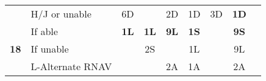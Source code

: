 \documentclass[10pt,landscape,a4paper]{article}
\begin{document}
\begin{textblock}{2}
\begin{table}[]
\begin{tabular}{|c|l|c|c|c|c|c|c|l}
                             & H/J or unable    & 6D                                          &                                             & 2D                       & 1D                       & 3D                                 & \textbf{1D}              &                                  \\ \cline{1-8}
\multirow{3}{*}{\textbf{18}} & If able          & \textbf{1L}                                 & \textbf{1L}                                 & \textbf{9L}              & \textbf{1S}              & \textbf{}                          & \textbf{9S}              &                                  \\ \cline{2-8}
                             & If unable        &                                             & 2S                                          &                          & 1L                       &                                    & 9L                       &                                  \\ \cline{2-8}
                             & L-Alternate RNAV &                                             &                                             & 2A                       & 1A                       &                                    & 2A                       &                                  \\ \cline{1-8}
\end{tabular}
\end{table}
\end{textblock}
\end{document}
